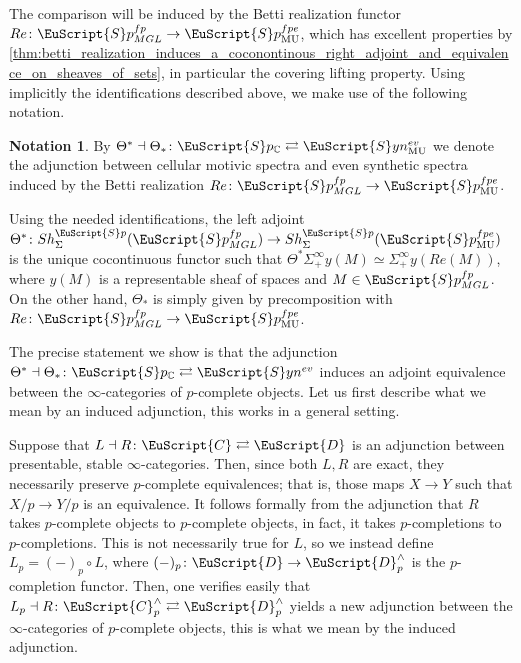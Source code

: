 \documentclass[oneside,a4paper]{amsart}
\newcommand{\euscr}[1]{\EuScript{#1}} %
\newcommand{\ccat}{\euscr{C}} %
\newcommand{\dcat}{\euscr{D}} %
\newcommand{\MU}{\mathrm{MU}} %
\newcommand{\spectra}{\euscr{S}p} %
\newcommand{\cspectra}{\euscr{S}p_{\mathbb{C}}} %
\newcommand{\synspectra}{\euscr{S}yn} %
\newcommand{\pcomplete}{^{\wedge} _{p}} %
\newcommand{\spectramglfp}{\spectra_{MGL}^{fp}} %
\newcommand{\spectramufpe}{\spectra_{\MU}^{fpe}} %
\theoremstyle{plain}
\theoremstyle{definition}
\newtheorem{notation}[thm]{Notation}
\theoremstyle{remark}
\begin{document}
The comparison will be induced by the Betti realization functor $Re \colon \spectramglfp \rightarrow \spectramufpe$, which has excellent properties by \cref{thm:betti_realization_induces_a_coconontinous_right_adjoint_and_equivalence_on_sheaves_of_sets}, in particular the covering lifting property. Using implicitly the identifications described above, we make use of the following notation.

\begin{notation}
By $\Theta^{*} \dashv \Theta_{*} \colon \cspectra \rightleftarrows \synspectra_{\MU}^{ev}$ we denote the adjunction between cellular motivic spectra and even synthetic spectra induced by the Betti realization $Re \colon \spectramglfp \rightarrow \spectramufpe$. 
\end{notation}
Using the needed identifications, the left adjoint $\Theta^{*} \colon Sh_{\Sigma}^{\spectra}(\spectramglfp) \rightarrow Sh_{\Sigma}^{\spectra}(\spectramufpe)$ is the unique cocontinuous functor such that $\Theta^{*} \Sigma^{\infty}_{+} y(M) \simeq \Sigma^{\infty}_{+} y(Re(M))$, where $y(M)$ is a representable sheaf of spaces and $M \in \spectramglfp$. On the other hand, $\Theta_{*}$ is simply given by precomposition with $Re \colon \spectramglfp \rightarrow \spectramufpe$. 

The precise statement we show is that the adjunction $\Theta^{*} \dashv \Theta_{*} \colon \cspectra \rightleftarrows \synspectra^{ev}$ induces an adjoint equivalence between the $\infty$-categories of $p$-complete objects. Let us first describe what we mean by an induced adjunction, this works in a general setting. 

Suppose that $L \dashv R \colon \ccat \rightleftarrows \dcat$ is an adjunction between presentable, stable $\infty$-categories. Then, since both $L, R$ are exact, they necessarily preserve $p$-complete equivalences; that is, those maps $X \rightarrow Y$ such that $X / p \rightarrow Y / p$ is an equivalence. It follows formally from the adjunction that $R$ takes $p$-complete objects to $p$-complete objects, in fact, it takes $p$-completions to $p$-completions. This is not necessarily true for $L$, so we instead define $L_{p} = (-)_{p} \circ L$, where $(-)_{p} \colon \dcat \rightarrow \dcat \pcomplete$ is the $p$-completion functor. Then, one verifies easily that $L_{p} \dashv R \colon \ccat \pcomplete \rightleftarrows \dcat \pcomplete$ yields a new adjunction between the $\infty$-categories of $p$-complete objects, this is what we mean by the induced adjunction. 
\end{document}
